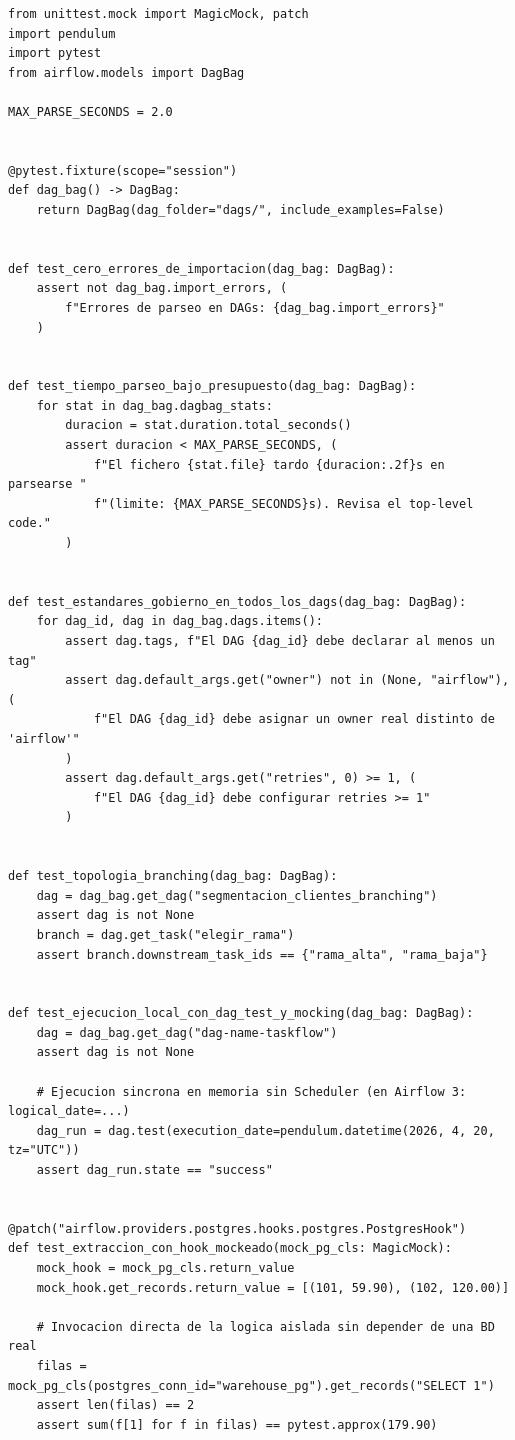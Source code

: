 \begin{lstlisting}[style=python, caption={Suite de pruebas automatizadas con \pkg{pytest}: validación del \code{DagBag}, reglas de gobierno, mocking de Hooks y \code{dag.test()}.}, label={lst:pytest-dags}]
from unittest.mock import MagicMock, patch
import pendulum
import pytest
from airflow.models import DagBag

MAX_PARSE_SECONDS = 2.0


@pytest.fixture(scope="session")
def dag_bag() -> DagBag:
    return DagBag(dag_folder="dags/", include_examples=False)


def test_cero_errores_de_importacion(dag_bag: DagBag):
    assert not dag_bag.import_errors, (
        f"Errores de parseo en DAGs: {dag_bag.import_errors}"
    )


def test_tiempo_parseo_bajo_presupuesto(dag_bag: DagBag):
    for stat in dag_bag.dagbag_stats:
        duracion = stat.duration.total_seconds()
        assert duracion < MAX_PARSE_SECONDS, (
            f"El fichero {stat.file} tardo {duracion:.2f}s en parsearse "
            f"(limite: {MAX_PARSE_SECONDS}s). Revisa el top-level code."
        )


def test_estandares_gobierno_en_todos_los_dags(dag_bag: DagBag):
    for dag_id, dag in dag_bag.dags.items():
        assert dag.tags, f"El DAG {dag_id} debe declarar al menos un tag"
        assert dag.default_args.get("owner") not in (None, "airflow"), (
            f"El DAG {dag_id} debe asignar un owner real distinto de 'airflow'"
        )
        assert dag.default_args.get("retries", 0) >= 1, (
            f"El DAG {dag_id} debe configurar retries >= 1"
        )


def test_topologia_branching(dag_bag: DagBag):
    dag = dag_bag.get_dag("segmentacion_clientes_branching")
    assert dag is not None
    branch = dag.get_task("elegir_rama")
    assert branch.downstream_task_ids == {"rama_alta", "rama_baja"}


def test_ejecucion_local_con_dag_test_y_mocking(dag_bag: DagBag):
    dag = dag_bag.get_dag("dag-name-taskflow")
    assert dag is not None

    # Ejecucion sincrona en memoria sin Scheduler (en Airflow 3: logical_date=...)
    dag_run = dag.test(execution_date=pendulum.datetime(2026, 4, 20, tz="UTC"))
    assert dag_run.state == "success"


@patch("airflow.providers.postgres.hooks.postgres.PostgresHook")
def test_extraccion_con_hook_mockeado(mock_pg_cls: MagicMock):
    mock_hook = mock_pg_cls.return_value
    mock_hook.get_records.return_value = [(101, 59.90), (102, 120.00)]

    # Invocacion directa de la logica aislada sin depender de una BD real
    filas = mock_pg_cls(postgres_conn_id="warehouse_pg").get_records("SELECT 1")
    assert len(filas) == 2
    assert sum(f[1] for f in filas) == pytest.approx(179.90)
\end{lstlisting}

